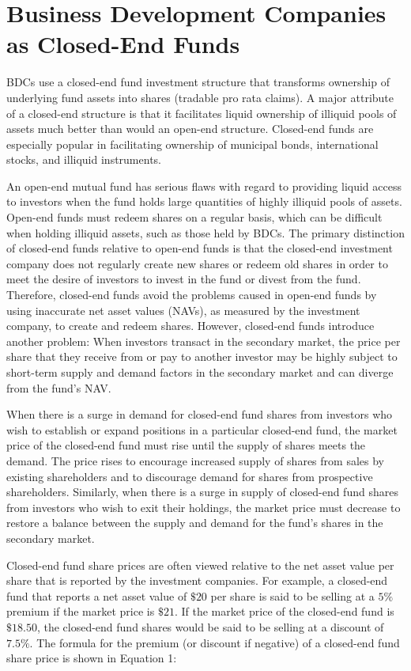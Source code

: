 \documentclass[11pt]{article}
\begin{document}
\section*{Business Development Companies as Closed-End Funds}
BDCs use a closed-end fund investment structure that transforms ownership of underlying fund assets into shares (tradable pro rata claims). A major attribute of a closed-end structure is that it facilitates liquid ownership of illiquid pools of assets much better than would an open-end structure. Closed-end funds are especially popular in facilitating ownership of municipal bonds, international stocks, and illiquid instruments.

An open-end mutual fund has serious flaws with regard to providing liquid access to investors when the fund holds large quantities of highly illiquid pools of assets. Open-end funds must redeem shares on a regular basis, which can be difficult when holding illiquid assets, such as those held by BDCs. The primary distinction of closed-end funds relative to open-end funds is that the closed-end investment company does not regularly create new shares or redeem old shares in order to meet the desire of investors to invest in the fund or divest from the fund. Therefore, closed-end funds avoid the problems caused in open-end funds by using inaccurate net asset values (NAVs), as measured by the investment company, to create and redeem shares. However, closed-end funds introduce another problem: When investors transact in the secondary market, the price per share that they receive from or pay to another investor may be highly subject to short-term supply and demand factors in the secondary market and can diverge from the fund's NAV.

When there is a surge in demand for closed-end fund shares from investors who wish to establish or expand positions in a particular closed-end fund, the market price of the closed-end fund must rise until the supply of shares meets the demand. The price rises to encourage increased supply of shares from sales by existing shareholders and to discourage demand for shares from prospective shareholders. Similarly, when there is a surge in supply of closed-end fund shares from investors who wish to exit their holdings, the market price must decrease to restore a balance between the supply and demand for the fund's shares in the secondary market.

Closed-end fund share prices are often viewed relative to the net asset value per share that is reported by the investment companies. For example, a closed-end fund that reports a net asset value of $\$ 20$ per share is said to be selling at a $5 \%$ premium if the market price is $\$ 21$. If the market price of the closed-end fund is $\$ 18.50$, the closed-end fund shares would be said to be selling at a discount of $7.5 \%$. The formula for the premium (or discount if negative) of a closed-end fund share price is shown in Equation 1:
\end{document}
